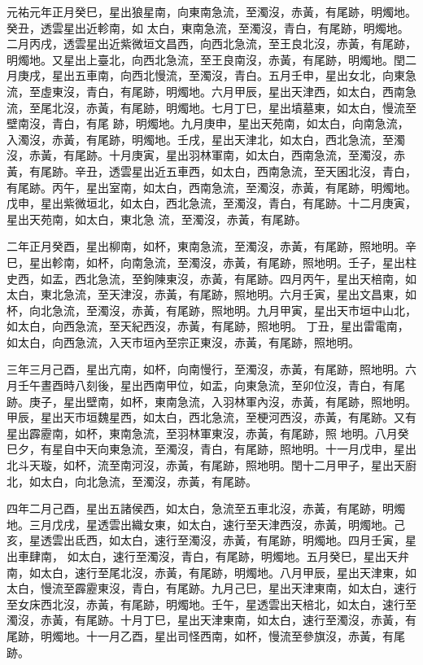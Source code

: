 \begin{pinyinscope}
 元祐元年正月癸巳，星出狼星南，向東南急流，至濁沒，赤黃，有尾跡，明燭地。癸丑，透雲星出近軫南，如
 太白，東南急流，至濁沒，青白，有尾跡，明燭地。二月丙戌，透雲星出近紫微垣文昌西，向西北急流，至王良北沒，赤黃，有尾跡，明燭地。又星出上臺北，向西北急流，至王良南沒，赤黃，有尾跡，明燭地。閏二月庚戌，星出五車南，向西北慢流，至濁沒，青白。五月壬申，星出女北，向東急流，至虛東沒，青白，有尾跡，明燭地。六月甲辰，星出天津西，如太白，西南急流，至尾北沒，赤黃，有尾跡，明燭地。七月丁巳，星出墳墓東，如太白，慢流至壁南沒，青白，有尾
 跡，明燭地。九月庚申，星出天苑南，如太白，向南急流，入濁沒，赤黃，有尾跡，明燭地。壬戌，星出天津北，如太白，西北急流，至濁沒，赤黃，有尾跡。十月庚寅，星出羽林軍南，如太白，西南急流，至濁沒，赤黃，有尾跡。辛丑，透雲星出近五車西，如太白，西南急流，至天囷北沒，青白，有尾跡。丙午，星出室南，如太白，西南急流，至濁沒，赤黃，有尾跡，明燭地。戊申，星出紫微垣北，如太白，西北急流，至濁沒，青白，有尾跡。十二月庚寅，星出天苑南，如太白，東北急
 流，至濁沒，赤黃，有尾跡。



 二年正月癸酉，星出柳南，如杯，東南急流，至濁沒，赤黃，有尾跡，照地明。辛巳，星出軫南，如杯，向南急流，至濁沒，赤黃，有尾跡，照地明。壬子，星出柱史西，如盂，西北急流，至鉤陳東沒，赤黃，有尾跡。四月丙午，星出天棓南，如太白，東北急流，至天津沒，赤黃，有尾跡，照地明。六月壬寅，星出文昌東，如杯，向北急流，至濁沒，赤黃，有尾跡，照地明。九月甲寅，星出天市垣中山北，如太白，向西急流，至天紀西沒，赤黃，有尾跡，照地明。
 丁丑，星出雷電南，如太白，向西急流，入天市垣內至宗正東沒，赤黃，有尾跡，照地明。



 三年三月己酉，星出亢南，如杯，向南慢行，至濁沒，赤黃，有尾跡，照地明。六月壬午晝酉時八刻後，星出西南甲位，如盂，向東急流，至卯位沒，青白，有尾跡。庚子，星出壁南，如杯，東南急流，入羽林軍內沒，赤黃，有尾跡，照地明。甲辰，星出天市垣魏星西，如太白，西北急流，至梗河西沒，赤黃，有尾跡。又有星出霹靂南，如杯，東南急流，至羽林軍東沒，赤黃，有尾跡，照
 地明。八月癸巳夕，有星自中天向東急流，至濁沒，青白，有尾跡，照地明。十一月戊申，星出北斗天璇，如杯，流至南河沒，赤黃，有尾跡，照地明。閏十二月甲子，星出天廚北，如太白，向北急流，至濁沒，赤黃，有尾跡。



 四年二月己酉，星出五諸侯西，如太白，急流至五車北沒，赤黃，有尾跡，明燭地。三月戊戌，星透雲出織女東，如太白，速行至天津西沒，赤黃，明燭地。己亥，星透雲出氐西，如太白，速行至濁沒，赤黃，有尾跡，明燭地。四月壬寅，星出車肆南，
 如太白，速行至濁沒，青白，有尾跡，明燭地。五月癸巳，星出天弁南，如太白，速行至尾北沒，赤黃，有尾跡，明燭地。八月甲辰，星出天津東，如太白，慢流至霹靂東沒，青白，有尾跡。九月己巳，星出天津東南，如太白，速行至女床西北沒，赤黃，有尾跡，明燭地。壬午，星透雲出天棓北，如太白，速行至濁沒，赤黃，有尾跡。十月丁巳，星出天津東南，如太白，速行至濁沒，赤黃，有尾跡，明燭地。十一月乙酉，星出司怪西南，如杯，慢流至參旗沒，赤黃，有尾跡。




\end{pinyinscope}
